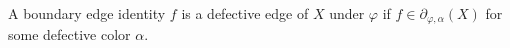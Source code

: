 \begin{definition}
A boundary edge identity $f$ is a defective edge of $X$ under $\varphi$ if
$f\in\partial_{\varphi,\alpha}(X)$ for some defective color $\alpha$.
\end{definition}
